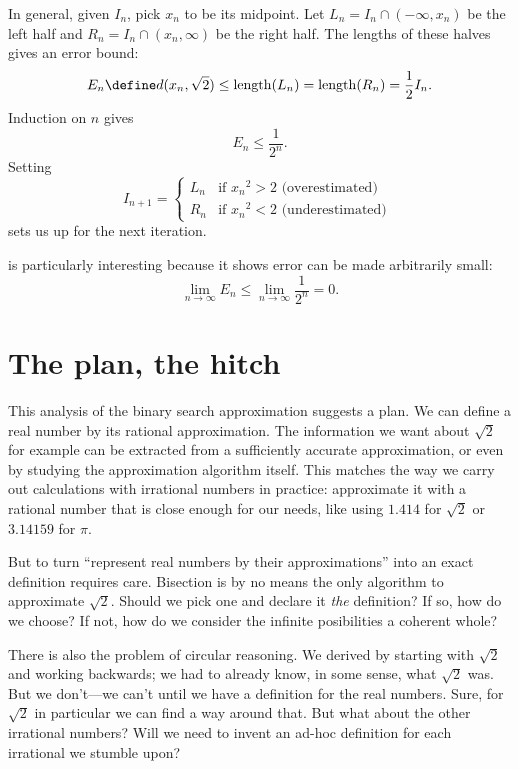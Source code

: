 \documentclass{scrartcl}
\newcommand{\dist}{d}
\newcommand{\length}{\mathrm{length}}
\begin{document}
\begin{example}
  In general, given \(I_{n}\), pick \(x_{n}\) to be its midpoint. Let \(L_{n}=I_{n} \cap (-\infty, x_{n})\) be the left half and \(R_{n}=I_{n}\cap (x_{n},\infty)\) be the right half. The lengths of these halves gives an error bound:
  \[
    E_{n} \define \dist(x_{n},\sqrt 2) \leq \length(L_{n}) = \length(R_{n}) = \frac12 I_{n}.
  \]
  Induction on $n$ gives
  \begin{equation}
    E_{n} \leq \frac{1}{2^{n}}.\label{eq:binary search error bound}
  \end{equation}
  Setting
  \[
    I_{n+1} =
    \begin{cases}
      L_{n}& \textrm{if } {x_{n}}^{2} > 2 \textrm{ (overestimated)}\\
      R_{n}& \textrm{if } {x_{n}}^{2} < 2 \textrm{ (underestimated) }
    \end{cases}
  \]
  sets us up for the next iteration.

   is particularly interesting because it shows error can be made arbitrarily small:
  \[
    \lim_{n\to\infty} E_{n} \leq \lim_{n\to\infty}\frac{1}{2^{n}} =0.
  \]
\end{example}

\section{The plan, the hitch}
This analysis of the binary search approximation suggests a plan. We can define a real number by its rational approximation. The information we want about \(\sqrt 2\) for example can be extracted from a sufficiently accurate approximation, or even by studying the approximation algorithm itself. This matches the way we carry out calculations with irrational numbers in practice: approximate it with a rational number that is close enough for our needs, like using \(1.414\) for \(\sqrt 2\) or \(3.14159\) for \(\pi\).

But to turn ``represent real numbers by their approximations'' into an exact definition requires care. Bisection is by no means the only algorithm to approximate \(\sqrt 2\). Should we pick one and declare it \emph{the} definition? If so, how do we choose? If not, how do we consider the infinite posibilities a coherent whole?

There is also the problem of circular reasoning. We derived  by starting with \(\sqrt 2\) and working backwards; we had to already know, in some sense, what \(\sqrt 2\) was. But we don't---we can't until we have a definition for the real numbers. Sure, for \(\sqrt 2\) in particular we can find a way around that. But what about the other irrational numbers? Will we need to invent an ad-hoc definition for each irrational we stumble upon?
\end{document}
